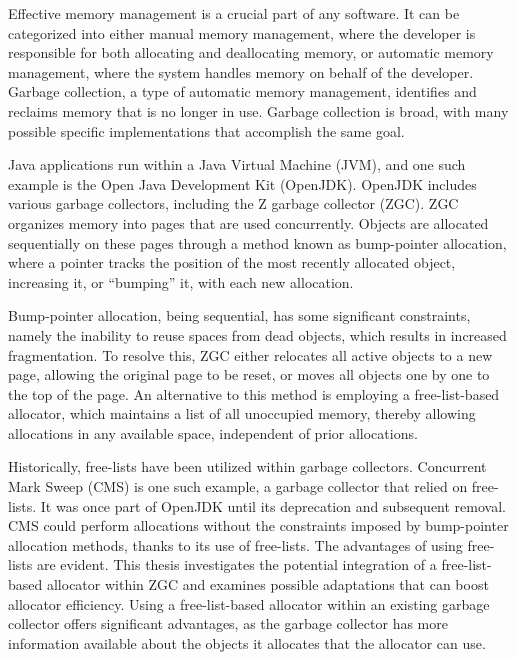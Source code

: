 Effective memory management is a crucial part of any software. It can be categorized into either manual memory management, where the developer is responsible for both allocating and deallocating memory, or automatic memory management, where the system handles memory on behalf of the developer. Garbage collection, a type of automatic memory management, identifies and reclaims memory that is no longer in use. Garbage collection is broad, with many possible specific implementations that accomplish the same goal.

Java applications run within a Java Virtual Machine (JVM), and one such example is the Open Java Development Kit (OpenJDK). OpenJDK includes various garbage collectors, including the Z garbage collector (ZGC). ZGC organizes memory into pages that are used concurrently. Objects are allocated sequentially on these pages through a method known as bump-pointer allocation, where a pointer tracks the position of the most recently allocated object, increasing it, or ``bumping'' it, with each new allocation.

Bump-pointer allocation, being sequential, has some significant constraints, namely the inability to reuse spaces from dead objects, which results in increased fragmentation. To resolve this, ZGC either relocates all active objects to a new page, allowing the original page to be reset, or moves all objects one by one to the top of the page. An alternative to this method is employing a free-list-based allocator, which maintains a list of all unoccupied memory, thereby allowing allocations in any available space, independent of prior allocations.

Historically, free-lists have been utilized within garbage collectors. Concurrent Mark Sweep (CMS) is one such example, a garbage collector that relied on free-lists. It was once part of OpenJDK until its deprecation and subsequent removal. CMS could perform allocations without the constraints imposed by bump-pointer allocation methods, thanks to its use of free-lists. The advantages of using free-lists are evident. This thesis investigates the potential integration of a free-list-based allocator within ZGC and examines possible adaptations that can boost allocator efficiency. Using a free-list-based allocator within an existing garbage collector offers significant advantages, as the garbage collector has more information available about the objects it allocates that the allocator can use.


